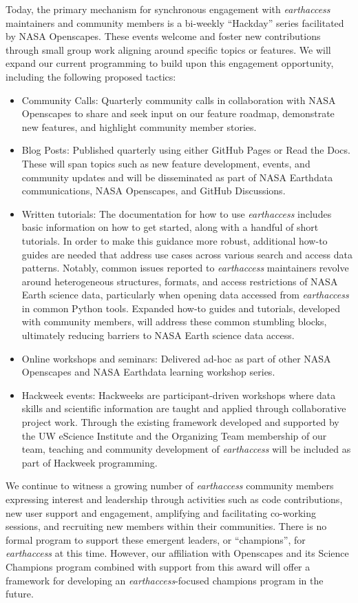 \documentclass{ROSES-NASA-proposal}
\newcommand{\earthaccess}{\textit{earthaccess}\xspace} %
\begin{document}
Today, the primary mechanism for synchronous engagement with \earthaccess maintainers and community members is a bi-weekly ``Hackday'' series facilitated by NASA Openscapes. These events welcome and foster new contributions through small group work aligning around specific topics or features. We will expand our current programming to build upon this engagement opportunity, including the following proposed tactics:

\begin{itemize}[itemsep=-.1em]
    \item Community Calls: Quarterly community calls in collaboration with NASA Openscapes to share and seek input on our feature roadmap, demonstrate new features, and highlight community member stories. 
    \item Blog Posts: Published quarterly using either GitHub Pages or Read the Docs. These will span topics such as new feature development, events, and community updates and will be disseminated as part of NASA Earthdata communications, NASA Openscapes, and GitHub Discussions. 
    \item Written tutorials: The documentation for how to use \earthaccess includes basic information on how to get started, along with a handful of short tutorials. In order to make this guidance more robust, additional how-to guides are needed that address use cases across various search and access data patterns. Notably, common issues reported to \earthaccess maintainers revolve around heterogeneous structures, formats, and access restrictions of NASA Earth science data, particularly when opening data accessed from \earthaccess in common Python tools. Expanded how-to guides and tutorials, developed with community members, will address these common stumbling blocks, ultimately reducing barriers to NASA Earth science data access. 
    \item Online workshops and seminars: Delivered ad-hoc as part of other NASA Openscapes and NASA Earthdata learning workshop series.
    \item Hackweek events: Hackweeks are participant-driven workshops where data skills and scientific information are taught and applied through collaborative project work. Through the existing framework developed and supported by the UW eScience Institute and the Organizing Team membership of our team, teaching and community development of \earthaccess will be included as part of Hackweek programming.
\end{itemize}

We continue to witness a growing number of \earthaccess community members expressing interest and leadership through activities such as code contributions, new user support and engagement, amplifying and facilitating co-working sessions, and recruiting new members within their communities. There is no formal program to support these emergent leaders, or ``champions'', for \earthaccess at this time. However, our affiliation with Openscapes and its Science Champions program combined with support from this award will offer a framework for developing an \earthaccess-focused champions program in the future. 
\end{document}
